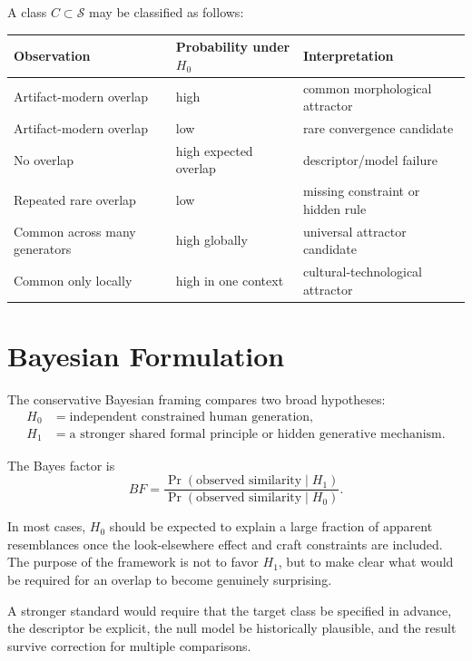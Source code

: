 \documentclass[11pt,a4paper]{article}
\DeclareMathOperator{\Prob}{Pr}
\begin{document}
A class $C\subset\mathcal{S}$ may be classified as follows:
\begin{center}
\begin{tabular}{p{3.8cm}p{3.6cm}p{4.6cm}}
\toprule
Observation & Probability under $H_0$ & Interpretation \\
\midrule
Artifact-modern overlap & high & common morphological attractor \\
Artifact-modern overlap & low & rare convergence candidate \\
No overlap & high expected overlap & descriptor/model failure \\
Repeated rare overlap & low & missing constraint or hidden rule \\
Common across many generators & high globally & universal attractor candidate \\
Common only locally & high in one context & cultural-technological attractor \\
\bottomrule
\end{tabular}
\end{center}

\section{Bayesian Formulation}

The conservative Bayesian framing compares two broad hypotheses:
\begin{align}
    H_0 &= \text{independent constrained human generation},\\
    H_1 &= \text{a stronger shared formal principle or hidden generative mechanism}.
\end{align}

The Bayes factor is
\begin{equation}
    BF=\frac{\Prob(\text{observed similarity}\mid H_1)}{\Prob(\text{observed similarity}\mid H_0)}.
\end{equation}

In most cases, $H_0$ should be expected to explain a large fraction of apparent resemblances once the look-elsewhere effect and craft constraints are included. The purpose of the framework is not to favor $H_1$, but to make clear what would be required for an overlap to become genuinely surprising.

A stronger standard would require that the target class be specified in advance, the descriptor be explicit, the null model be historically plausible, and the result survive correction for multiple comparisons.
\end{document}
